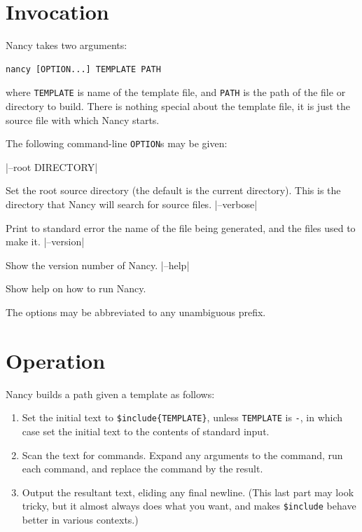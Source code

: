 \documentclass[a4paper,english]{scrartcl}
\begin{document}
\section{Invocation}

Nancy takes two arguments:

\begin{verbatim}
nancy [OPTION...] TEMPLATE PATH
\end{verbatim}

\noindent where \verb|TEMPLATE| is name of the template file, and \verb|PATH| is the path of the file or directory to build. There is nothing special about the template file, it is just the source file with which Nancy starts.

The following command-line \verb|OPTION|s may be given:

\begin{description}
|--root DIRECTORY|
\item[\UseVerb{root}]Set the root source directory (the default is the current directory). This is the directory that Nancy will search for source files.
|--verbose|
\item[\UseVerb{verbose}]Print to standard error the name of the file being generated, and the files used to make it.
|--version|
\item[\UseVerb{version}]Show the version number of Nancy.
|--help|
\item[\UseVerb{help}]Show help on how to run Nancy.
\end{description}

The options may be abbreviated to any unambiguous prefix.

\section{Operation}
\label{operation}

Nancy builds a path given a template as follows:

\begin{enumerate}
\item Set the initial text to \verb|$include{TEMPLATE}|, unless \verb|TEMPLATE| is \verb|-|, in which case set the initial text to the contents of standard input.
\item Scan the text for commands. Expand any arguments to the command, run each command, and replace the command by the result.
\item Output the resultant text, eliding any final newline. (This last part may look tricky, but it almost always does what you want, and makes \verb|$include| behave better in various contexts.)
\end{enumerate}
\end{document}
